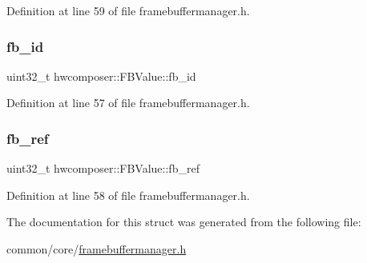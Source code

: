 Definition at line 59 of file framebuffermanager.\+h.

\mbox{\label{structhwcomposer_1_1FBValue_ae0c9875a23f139b972e17f626a36eb8b}} 
\subsubsection{\texorpdfstring{fb\+\_\+id}{fb\_id}}
{\footnotesize\ttfamily uint32\+\_\+t hwcomposer\+::\+F\+B\+Value\+::fb\+\_\+id}



Definition at line 57 of file framebuffermanager.\+h.

\mbox{\label{structhwcomposer_1_1FBValue_af5f43ee16be807bb84de9396c210d338}} 
\subsubsection{\texorpdfstring{fb\+\_\+ref}{fb\_ref}}
{\footnotesize\ttfamily uint32\+\_\+t hwcomposer\+::\+F\+B\+Value\+::fb\+\_\+ref}



Definition at line 58 of file framebuffermanager.\+h.



The documentation for this struct was generated from the following file\+:\begin{DoxyCompactItemize}
\item 
common/core/\mbox{\hyperlink{framebuffermanager_8h}{framebuffermanager.\+h}}\end{DoxyCompactItemize}

